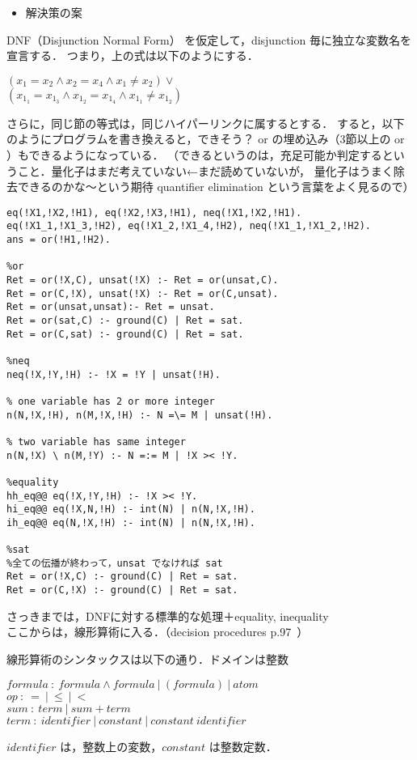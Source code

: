\begin{itemize}
    \item 解決策の案
\end{itemize}
DNF（Disjunction Normal Form） を仮定して，disjunction 毎に独立な変数名を宣言する．
つまり，上の式は以下のようにする．
\begin{center}
    $(x_1 = x_2 \wedge x_2 = x_4 \wedge x_1 \neq x_2) \vee$\\
    $(x_{1_1} = x_{1_3} \wedge x_{1_2} = x_{1_4} \wedge x_{1_1} \neq x_{1_2})$
\end{center}
さらに，同じ節の等式は，同じハイパーリンクに属するとする．
すると，以下のようにプログラムを書き換えると，できそう？
or の埋め込み（3節以上の or ）もできるようになっている．
（できるというのは，充足可能か判定するということ．量化子はまだ考えていない←まだ読めていないが，
量化子はうまく除去できるのかな～という期待 quantifier elimination という言葉をよく見るので）
\begin{lstlisting}
eq(!X1,!X2,!H1), eq(!X2,!X3,!H1), neq(!X1,!X2,!H1).
eq(!X1_1,!X1_3,!H2), eq(!X1_2,!X1_4,!H2), neq(!X1_1,!X1_2,!H2).
ans = or(!H1,!H2).

%or
Ret = or(!X,C), unsat(!X) :- Ret = or(unsat,C).
Ret = or(C,!X), unsat(!X) :- Ret = or(C,unsat).
Ret = or(unsat,unsat):- Ret = unsat.
Ret = or(sat,C) :- ground(C) | Ret = sat.
Ret = or(C,sat) :- ground(C) | Ret = sat.

%neq
neq(!X,!Y,!H) :- !X = !Y | unsat(!H).

% one variable has 2 or more integer
n(N,!X,!H), n(M,!X,!H) :- N =\= M | unsat(!H).

% two variable has same integer
n(N,!X) \ n(M,!Y) :- N =:= M | !X >< !Y.

%equality
hh_eq@@ eq(!X,!Y,!H) :- !X >< !Y.
hi_eq@@ eq(!X,N,!H) :- int(N) | n(N,!X,!H).
ih_eq@@ eq(N,!X,!H) :- int(N) | n(N,!X,!H).

%sat
%全ての伝播が終わって，unsat でなければ sat
Ret = or(!X,C) :- ground(C) | Ret = sat.
Ret = or(C,!X) :- ground(C) | Ret = sat.
\end{lstlisting}

さっきまでは，DNFに対する標準的な処理＋equality, inequality\\
ここからは，線形算術に入る．（decision procedures p.97~）

線形算術のシンタックスは以下の通り．ドメインは整数
\begin{center}
    $formula\: :\: formula\wedge formula \:|\: (formula) \:|\: atom$\\
    $op \::\: = \:|\: \leq \:|\: <$\\
    $sum \::\: term \:|\: sum+term$\\
    $term \::\: identifier \:|\: constant \:|\: constant \: identifier$
\end{center}
$identifier$ は，整数上の変数，$constant$ は整数定数．

